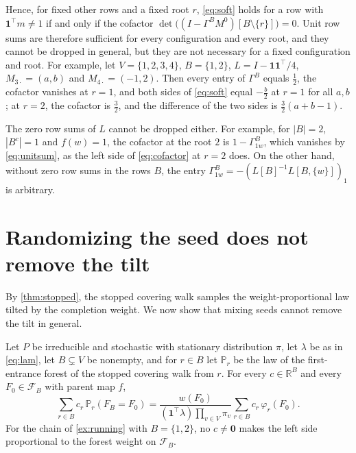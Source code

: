 \documentclass[onefignum,onetabnum,nohypdvips]{siamart250211}
\numberwithin{theorem}{section}
\numberwithin{equation}{section}
\newcommand{\Fset}{\mathcal{F}}
\newcommand{\R}{\mathbb{R}}
\newcommand{\pr}{\mathbb{P}}
\newcommand{\one}{\mathbf{1}}
\newcommand{\zero}{\mathbf{0}}
\begin{document}
Hence, for fixed other rows and a fixed root $r$, \eqref{eq:soft} holds
for a row with $\one^{\top}m\ne1$ if and only if the cofactor
$\det\big((I-\Gamma^BM^{0})[B\setminus\{r\}]\big)=0$. Unit row
sums are therefore sufficient for every configuration and every root,
and they cannot be dropped in general, but they are not necessary
for a fixed configuration and root. For example, let $V=\{1,2,3,4\}$,
$B=\{1,2\}$, $L=I-\one\one^{\top}/4$, $M_{3\cdot}=(a,b)$ and
$M_{4\cdot}=(-1,2)$. Then every entry of $\Gamma^B$ equals $\tfrac12$,
the cofactor vanishes at $r=1$, and both sides of \eqref{eq:soft} equal
$-\tfrac b2$ at $r=1$ for all $a,b$; at $r=2$, the cofactor is $\tfrac32$,
and the difference of the two sides is $\tfrac32(a+b-1)$.

The zero row sums of $L$ cannot be dropped either. For example,
for $|B|=2$, $|B^c|=1$ and $f(w)=1$, the cofactor at the root $2$ is
$1-\Gamma^B_{1w}$, which vanishes by \eqref{eq:unitsum}, as the left side
of \eqref{eq:cofactor} at $r=2$ does. On the other hand, without zero
row sums in the rows $B$, the entry
$\Gamma^B_{1w}=-(L[B]^{-1}L[B,\{w\}])_1$ is arbitrary.

\section{Randomizing the seed does not remove the tilt}\label{sec:sm-seed}

By \cref{thm:stopped}, the stopped covering walk samples the
weight-proportional law tilted by the completion weight. We now show that
mixing seeds cannot remove the tilt in general.

\begin{proposition}\label{prop:notilt}
Let $P$ be irreducible and stochastic with stationary distribution
$\pi$, let $\lambda$ be as in \eqref{eq:lam}, let $B\subsetneq V$ be
nonempty, and for $r\in B$ let $\pr_r$ be the
law of the first-entrance forest of the stopped covering walk from $r$.
For every $c\in\R^{B}$ and every $F_0\in\Fset_B$ with parent map $f$,
\begin{equation}\label{eq:mixture}
\sum_{r\in B}c_r\,\pr_r(F_B=F_0)
=\frac{w(F_0)}{(\one^{\top}\lambda)\prod_{v\in V}\pi_v}
\sum_{r\in B}c_r\,\varphi_r(F_0).
\end{equation}
For the chain of \cref{ex:running} with $B=\{1,2\}$, no $c\ne\zero$
makes the left side proportional to the forest weight on $\Fset_B$.
\end{proposition}
\end{document}
